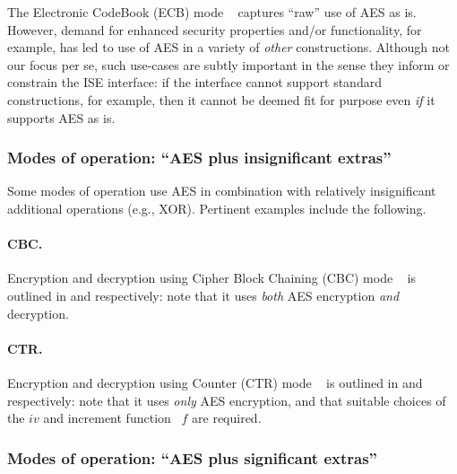 
The
Electronic CodeBook (ECB) mode
~\cite[Section 6.1]{NIST:sp.800.38a} 
captures ``raw'' use of AES as is.  However, demand for enhanced security
properties and/or functionality, for example, has led to use of AES in a
variety of {\em other} constructions.
Although not our focus per se, such use-cases are subtly important in the 
sense they inform or constrain the ISE interface: if the interface cannot 
support standard constructions, for example, then it cannot be deemed fit 
for purpose even {\em if} it supports AES as is.


\subsubsection{Modes of operation: ``AES plus insignificant extras''}

Some modes of operation use AES in combination with relatively
insignificant 
additional operations
(e.g., XOR).
Pertinent examples include the following.

\paragraph{CBC.}

Encryption
and 
decryption
using
Cipher Block Chaining (CBC) mode
~\cite[Section 6.2]{NIST:sp.800.38a}
is outlined in
and
respectively:
note that it uses {\em both} AES encryption {\em and} decryption.

\paragraph{CTR.}

Encryption
and 
decryption
using
Counter               (CTR) mode
~\cite[Section 6.5]{NIST:sp.800.38a}
is outlined in
and
respectively:
note that it uses {\em only} AES encryption, and that suitable choices of 
the $iv$ and increment function~\cite[Appendix B]{NIST:sp.800.38a} $f$ are
required.


\subsubsection{Modes of operation: ``AES plus   significant extras''}

